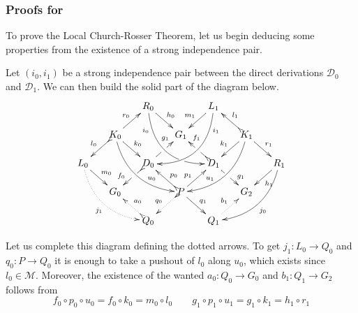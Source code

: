 \documentclass[a4paper,UKenglish,cleveref,pdftex,thm-restate,numberwithinsect,anonymous]{lipics}
\newcommand{\dder}[1]{\mathscr{#1}}
\begin{document}
\subsubsection{Proofs for }

To prove the Local Church-Rosser Theorem, let us begin deducing some properties from the existence of a strong independence pair. 

\begin{remark}\label{rem:deco} 
	Let $(i_0, i_1)$ be a strong
	independence pair between the direct derivations $\dder{D}_0$ and
	$\dder{D}_1$. We can then build the solid part of the diagram
	below.
	\[\xymatrix@C=15pt@R=15pt{&&R_0 \ar@/_.8cm/[ddrr]_(.2){i_0}|(.7)\hole
		\ar[dr]^{h_0}&& L_1\ar@/^.8cm/[ddll]^(.2){i_1}
		\ar[dl]_{m_1}\\&K_0\ar[dr]^{k_0}\ar@{>->}[dl]_{l_0}
		\ar@/_.6cm/[ddrr]^(.65){u_0}\ar[ur]^{r_0}&& G_1 && K_1
		\ar@/^.6cm/[ddll]_(.65){u_1}\ar[dl]_{k_1}\ar@{>->}[lu]_{l_1}
		\ar[dr]^{r_1}\\L_0 \ar[dr]^{m_0}
		\ar@{.>}@/_.6cm/[ddrr]_{j_1}&& D_0
		\ar@{>->}[dl]|(.42)\hole_(.64){f_0}\ar[ur]|(.48)\hole^(.7){g_1}&&D_1
		\ar[dr]|(.42)\hole^(.65){g_1}
		\ar@{>->}[ul]|(.48)\hole_(.7){f_1}&&R_1\ar@/^.6cm/[ddll]^{j_0}\ar[dl]^{h_1}\\&G_0
		&&P\ar[dr]^{q_1}
		\ar@{>.>}[dl]_{q_0}\ar[ur]^(.4){p_1}\ar@{>->}[ul]_(.4){p_0}&&G_2\\&&Q_0
		\ar@{>->}@{>.>}[ul]_{a_0} &&Q_1\ar@{.>}[ur]^{b_1}}
	\]
	
	Let us complete this diagram defining the dotted arrows. To get
	$j_1\colon L_0\to Q_0$ and $q_0\colon P\to Q_0$ it is enough to
	take a pushout of $l_0$ along $u_0$, which exists since
	$l_0\in \mathcal{M}$. Moreover, the existence of the wanted
	$a_0\colon Q_0\to G_0$ and $b_1\colon Q_1\to G_2$ follows from
	\[
	f_0\circ p_0 \circ u_0 = f_0\circ k_0 = m_0\circ l_0 \qquad
	g_1\circ p_1\circ u_1 = g_1\circ k_1=h_1\circ r_1
	\]
	

\end{remark}
\end{document}
